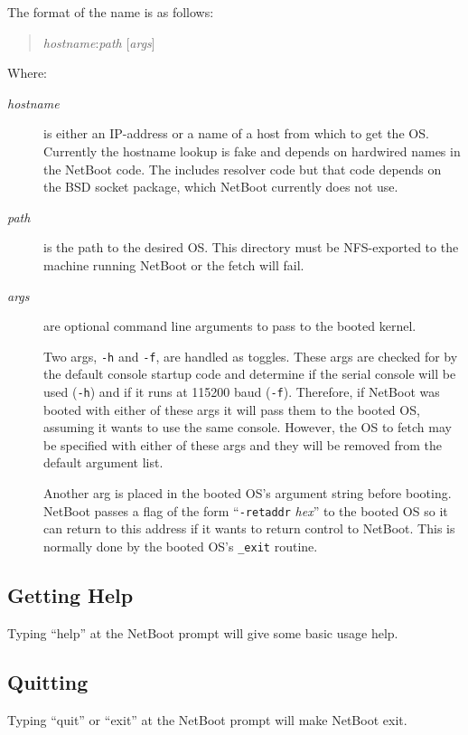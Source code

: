 The format of the name is as follows:
\begin{quote}
        \textsl{hostname}:\textsl{path} [\textsl{args}]
\end{quote}
Where:
\begin{description}
        \item[\textsl{hostname}] is either an IP-address or a name of
          a host from which to get the OS\@.
          Currently the hostname lookup is fake and depends on
          hardwired names in the NetBoot code.
          The \oskit{} includes resolver code but that code depends
          on the \oskit{} BSD socket package,
          which NetBoot currently does not use.
        \item[\textsl{path}] is the path to the desired OS\@.
          This directory must be NFS-exported to the machine
          running NetBoot or the fetch will fail.
        \item[\textsl{args}] are optional command line arguments to
          pass to the booted kernel.

          Two args, \texttt{-h} and \texttt{-f}, are handled as toggles.
          These args are checked for by the default \oskit{} console startup
          code and determine if the serial console will be used (\texttt{-h})
          and if it runs at 115200 baud (\texttt{-f}).
          Therefore, if NetBoot was booted with either of these args it
          will pass them to the booted OS,
          assuming it wants to use the same console.
          However, the OS to fetch may be specified with either of these
          args and they will be removed from the default argument list.

          Another arg is placed in the booted OS's argument string
          before booting.
          NetBoot passes a flag of the form
          ``\texttt{-retaddr} \textsl{hex}''
          to the booted OS so it can return to this address if it wants
          to return control to NetBoot.
          This is normally done by the booted OS's \texttt{_exit} routine.
\end{description}

\subsection{Getting Help}

Typing ``help'' at the NetBoot prompt will give some basic usage help.

\subsection{Quitting}

Typing ``quit'' or ``exit'' at the NetBoot prompt will make NetBoot exit.

